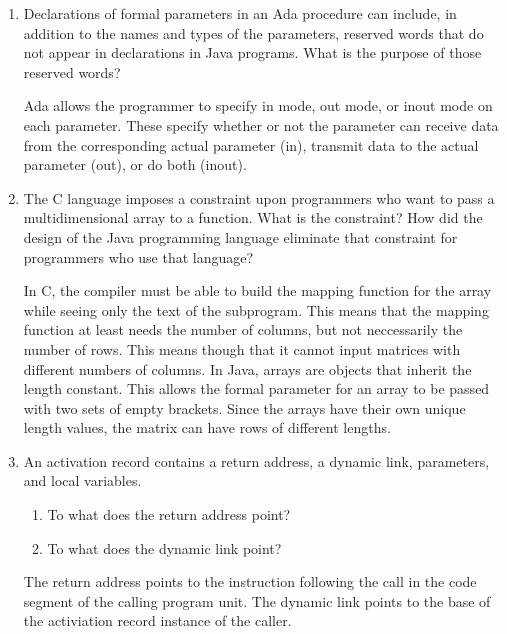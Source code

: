 \begin{enumerate}
  \item Declarations of formal parameters in an Ada procedure
    can include, in addition to the names and types of the
    parameters, reserved words that do not appear in declarations
    in Java programs. 
    What is the purpose of those reserved words?

  \begin{answer}
    Ada allows the programmer to specify in mode, out mode, or inout mode on each parameter. These specify whether or not the parameter can receive data from the corresponding actual parameter (in), transmit data to the actual parameter (out), or do both (inout).
  \end{answer}
 
  \item The C language imposes a constraint upon programmers
    who want to pass a multidimensional array to a function.
    What is the constraint? How did the design of the Java
    programming language eliminate that constraint for 
    programmers who use that language?

  \begin{answer}
    In C, the compiler must be able to build the mapping function for the array while seeing only the text of the subprogram. This means that the mapping function at least needs the number of columns, but not neccessarily the number of rows. This means though that it cannot input matrices with different numbers of columns.
    In Java, arrays are objects that inherit the length constant. This allows the formal parameter for an array to be passed with two sets of empty brackets. Since the arrays have their own unique length values, the matrix can have rows of different lengths.
  \end{answer}

  \item An activation record contains a return
    address, a dynamic link, parameters, and
    local variables.
  \begin{enumerate}
    \item To what does the return address point?
    \item To what does the dynamic link point?
    \end{enumerate}

  \begin{answer}
    The return address points to the instruction following the call in the code segment of the calling program unit. The dynamic link points to the base of the activiation record instance of the caller.
  \end{answer}


\end{enumerate}
